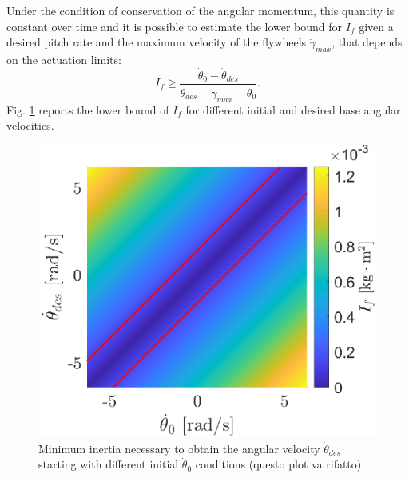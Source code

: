 \documentclass[journal,letterpaper]{IEEEtran}
\begin{document}
Under the condition of conservation of the angular momentum, this quantity is constant over time and it is possible to estimate the lower bound for $I_{f}$ given a desired pitch rate and the maximum velocity of the flywheels $\dot{\gamma}_{max}$, that depends on the actuation limits:
\begin{equation}
I_{f} \geq \dfrac{\dot{\theta}_0-\dot{\theta}_{des}}{\dot{\theta}_{des}+\dot{\gamma}_{max}-\dot{\theta}_0}.
\end{equation}
Fig. \ref{fig:inertia_limits} reports the lower bound of $I_{f}$ for different initial and desired base angular velocities.
\begin{figure}
	\centering
	\includegraphics[width=.7\linewidth]{figures/inertia_limits.eps}
	\caption{Minimum inertia necessary to obtain the angular velocity $\dot{\theta}_{des}$ starting with different initial $\dot{\theta}_0$ conditions (questo plot va rifatto)}
	\label{fig:inertia_limits}
\end{figure}
\end{document}

